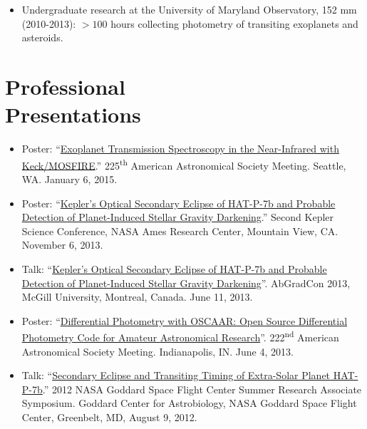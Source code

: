 \documentclass[margin]{res}
\begin{document}
\begin{resume}
\begin{itemize}
\item Undergraduate research at the University of Maryland Observatory, 152 mm (2010-2013): $>100$ hours collecting photometry of transiting exoplanets and asteroids. \\
\end{itemize}



\section{Professional\\ Presentations} 
\begin{itemize}  %

\item Poster: ``\href{http://adsabs.harvard.edu/abs/2015AAS...22525710M}{Exoplanet Transmission Spectroscopy in the Near-Infrared with Keck/MOSFIRE}.'' 225\textsuperscript{th} American Astronomical Society Meeting. Seattle, WA. January 6, 2015.

\item Poster: ``\href{http://nexsci.caltech.edu/conferences/KeplerII/posters/morris.pdf}{Kepler's Optical Secondary Eclipse of HAT-P-7b and Probable Detection of Planet-Induced Stellar Gravity Darkening}.'' Second Kepler Science Conference, NASA Ames Research Center, Mountain View, CA. November 6, 2013. 

\item Talk: ``\href{http://youtu.be/ZMfbkCzzQUE}{Kepler's Optical Secondary Eclipse of HAT-P-7b and Probable Detection of Planet-Induced Stellar Gravity Darkening}''. AbGradCon 2013, McGill University, Montreal, Canada. June 11, 2013.

\item Poster: ``\href{http://adsabs.harvard.edu/abs/2013AAS...22221717M}{Differential Photometry with OSCAAR: Open Source Differential Photometry Code for Amateur Astronomical Research}''. 222\textsuperscript{nd} American Astronomical Society Meeting. Indianapolis, IN. June 4, 2013.

\item Talk: ``\href{https://astrobiology.nasa.gov/seminars/featured-seminar-channels/gsfc-summer-internship/2012/08/09/gsfc-summer-research-associate-presentations/}{Secondary Eclipse and Transiting Timing of Extra-Solar Planet HAT-P-7b}.'' 2012 NASA Goddard Space Flight Center Summer Research Associate Symposium. Goddard Center for Astrobiology, NASA Goddard Space Flight Center, Greenbelt, MD, August 9, 2012.


\end{itemize}
\end{resume}
\end{document}
